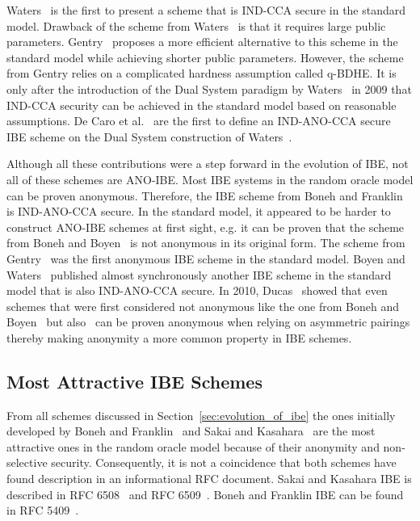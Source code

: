 Waters~\cite{art:Waters05} is the first to present a scheme that is IND-CCA secure in the standard model. Drawback of the scheme from Waters~\cite{art:Waters05} is that it requires large public parameters. Gentry~\cite{art:Gentry06} proposes a more efficient alternative to this scheme in the standard model while achieving shorter public parameters. However, the scheme from Gentry relies on a complicated hardness assumption called q-BDHE. It is only after the introduction of the Dual System paradigm by Waters~\cite{art:Waters09} in 2009 that IND-CCA security can be achieved in the standard model based on reasonable assumptions. De Caro et al.~\cite{art:CaroIP10} are the first to define an IND-ANO-CCA secure IBE scheme on the Dual System construction of Waters~\cite{art:Waters09}. %

Although all these contributions were a step forward in the evolution of IBE, not all of these schemes are ANO-IBE. Most IBE systems in the random oracle model can be proven anonymous. Therefore, the IBE scheme from Boneh and Franklin~\cite{art:BonehF01} is IND-ANO-CCA secure. In the standard model, it appeared to be harder to construct ANO-IBE schemes at first sight, e.g. it can be proven that the scheme from Boneh and Boyen~\cite{art:BonehB04} is not anonymous in its original form. The scheme from Gentry~\cite{art:Gentry06} was the first anonymous IBE scheme in the standard model. Boyen and Waters~\cite{art:BoyenW06} published almost synchronously another IBE scheme in the standard model that is also IND-ANO-CCA secure. In 2010, Ducas~\cite{art:Ducas10} showed that even schemes that were first considered not anonymous like the one from Boneh and Boyen~\cite{art:BonehB04} but also~\cite{art:BonehBG05,art:Waters05} can be proven anonymous when relying on asymmetric pairings thereby making anonymity a more common property in IBE schemes.

\subsection{Most Attractive IBE Schemes}
From all schemes discussed in Section~\ref{sec:evolution_of_ibe} the ones initially developed by Boneh and Franklin~\cite{art:BonehF01} and Sakai and Kasahara~\cite{art:SakaiK03} are the most attractive ones in the random oracle model because of their anonymity and non-selective security. Consequently, it is not a coincidence that both schemes have found description in an informational RFC document. Sakai and Kasahara IBE is described in RFC 6508~\cite{rfc6508} and RFC 6509~\cite{rfc6509}. Boneh and Franklin IBE can be found in RFC 5409~\cite{rfc5409}. 

